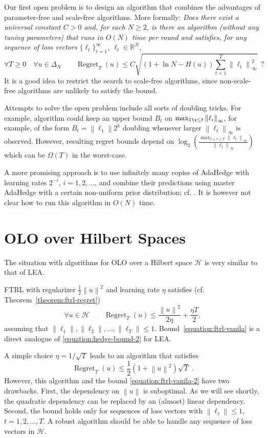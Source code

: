\documentclass{colt2016} %
\DeclareMathOperator{\Regret}{Regret}
\newcommand{\R}{\mathbb{R}}     %
\renewcommand{\H}{\mathcal{H}}  %
\newcommand{\norm}[1]{\left\|{#1}\right\|}
\begin{document}
Our first open problem is to design an algorithm that combines the advantages
of parameter-free and scale-free algorithms. More formally: \emph{Does there
exist a universal constant $C > 0$ and, for each $N \ge 2$, is there an
algorithm (without any tuning parameters) that runs in $O(N)$ time per round
and satisfies, for any sequence of loss
vectors $\{\ell_t\}_{t=1}^\infty$, $\ell_t \in \R^N$,}
$$
\forall T \ge 0 \quad \forall u \in \Delta_N \qquad \Regret_T(u) \le C \sqrt{(1 + \ln N - H(u)) \sum_{t=1}^T \norm{\ell_t}_\infty^2} \ \ ?
$$
It is a good idea to restrict the search to scale-free algorithms, since
non-scale-free algorithms are unlikely to satisfy the bound.

Attempts to solve the open problem include all sorts of doubling tricks.
For example, algorithm could keep an upper bound $B_t$ on $\max_{1 \i \le t}
\norm{\ell_i}_\infty$, for example, of the form $B_t = \norm{\ell_1} 2^k$
doubling whenever larger $\norm{\ell_t}_\infty$ is observed. However, resulting
regret bounds depend on $\log_2 \left( \frac{\max_{1 \le t \le T}
\norm{\ell_t}_\infty}{\norm{\ell_1}_\infty} \right)$ which can be $\Omega(T)$
in the worst-case.

A more promising approach is to use infinitely many copies of AdaHedge with
learning rates $2^{-i}$, $i=1,2,\dots$, and combine their predictions using
master AdaHedge with a certain non-uniform prior distribution; cf.
\cite{Foster-Rakhlin-Sridharan-2015}. It is however not clear how to run this
algorithm in $O(N)$ time.

\section{OLO over Hilbert Spaces}

The situation with algorithms for OLO over a Hilbert space $\H$ is very similar
to that of LEA.

FTRL with regularizer
$\frac{1}{2}\norm{u}^2$ and learning rate $\eta$ satisfies (cf. Theorem~\ref{theorem:ftrl-regret})
\begin{equation}
\label{equation:ftrl-vanila}
\forall u \in \H \qquad \Regret_T(u) \le \frac{\norm{u}^2}{2\eta} + \frac{\eta T}{2},
\end{equation}
assuming that $\norm{\ell_1}, \norm{\ell_2}, \dots, \norm{\ell_T} \le 1$.
Bound~\eqref{equation:ftrl-vanila} is a direct analogue of
\eqref{equation:hedge-bound-2} for LEA.

A simple choice $\eta = 1/\sqrt{T}$ leads to an algorithm that satisfies
\begin{equation}
\label{equation:ftrl-vanila-2}
\Regret_T(u) \le \frac{1}{2}\left(1+\norm{u}^2\right)\sqrt{T} \; .
\end{equation}
However, this algorithm and the bound \eqref{equation:ftrl-vanila-2} have two
drawbacks.  First, the dependency on $\norm{u}$ is suboptimal. As we will see
shortly, the quadratic dependency can be replaced by an (almost) linear
dependency.  Second, the bound holds only for sequences of loss vectors with
$\norm{\ell_t} \le 1$, $t=1,2,\dots,T$. A robust algorithm should be able to
handle any sequence of loss vectors in $\H$.
\end{document}

